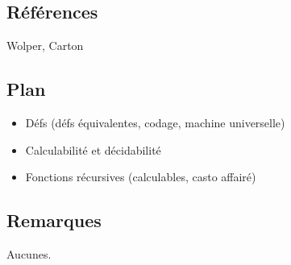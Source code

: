 \documentclass[../../Agregation.tex]{subfiles}
\begin{document}

\dvts

\subsection{Références}

Wolper, Carton

\subsection{Plan}

\begin{itemize}
	\item Défs (défs équivalentes, codage, machine universelle)
	\item Calculabilité et décidabilité
	\item Fonctions récursives (calculables, casto affairé)
\end{itemize}

\subsection{Remarques}

Aucunes.
\end{document}

